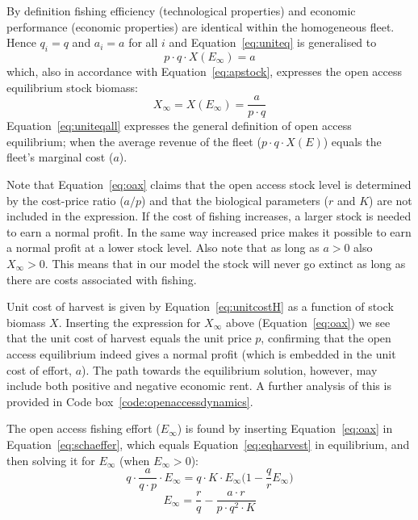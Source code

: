 \documentclass[11pt,fleqn]{book} %
\begin{document}
By definition fishing efficiency (technological properties) and economic performance (economic properties) are identical within the homogeneous fleet. Hence $q_i = q$ and $a_i = a$ for all $i$ and Equation~\ref{eq:uniteq} is generalised to
\begin{equation} 
\label{eq:uniteqall}
p \cdot q \cdot X(E_\infty)  = a
\end{equation}
which, also in accordance with Equation~\ref{eq:apstock}, expresses the open access equilibrium stock biomass:
\begin{equation} 
\label{eq:oax}
X_\infty = X(E_\infty) = \frac{a}{p \cdot q}
\end{equation}
Equation~\ref{eq:uniteqall} expresses the general definition of open access equilibrium; when the average revenue of the fleet ($p \cdot q \cdot X(E)$) equals the fleet's marginal cost ($a$).

Note that Equation~\ref{eq:oax} claims that the open access stock level is determined by the cost-price ratio ($a/p$) and that the biological parameters ($r$ and $K$) are not included in the expression. If the cost of fishing increases, a larger stock is needed to earn a normal profit. In the same way increased price makes it possible to earn a normal profit at a lower stock level. Also note that as long as $a > 0$ also $X_\infty > 0$. This means that in our model the stock will never go extinct as long as there are costs associated with fishing.

Unit cost of harvest is given by Equation~\ref{eq:unitcostH} as a function of stock biomass $X$. Inserting the expression for $X_\infty$ above (Equation~\ref{eq:oax}) we see that the unit cost of harvest equals the unit price $p$, confirming that the open access equilibrium indeed gives a normal profit (which is embedded in the unit cost of effort, $a$). The path towards the equilibrium solution, however, may include both positive and negative economic rent. A further analysis of this is provided in Code box~\ref{code:openaccessdynamics}.

The open access fishing effort ($E_\infty$) is found by inserting Equation~\ref{eq:oax} in Equation~\ref{eq:schaeffer}, which equals Equation~\ref{eq:eqharvest} in equilibrium, and then solving it for $E_\infty$ (when $E_\infty > 0$):
\begin{equation*} 
q \cdot \frac{a}{q \cdot p} \cdot E_\infty = q \cdot K \cdot E_\infty \Big(1- \frac{q}{r} E_\infty\Big)
\end{equation*}
\begin{equation} 
\label{eq:oae}
E_\infty = \frac{r}{q} - \frac{a \cdot r}{p \cdot q^2 \cdot K}
\end{equation}
\end{document}
